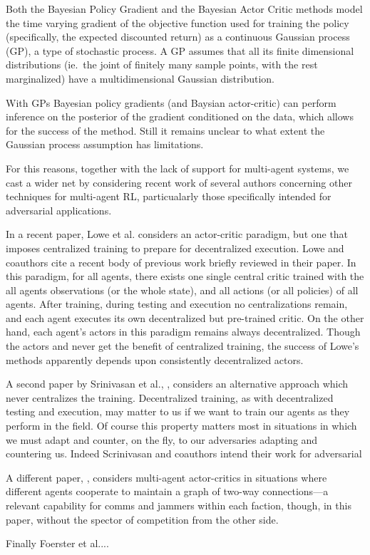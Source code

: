 \documentclass{article}
\begin{document}
Both the Bayesian Policy Gradient and the Bayesian Actor Critic
methods model the time varying gradient of the objective function used
for training the policy (specifically, the expected discounted return)
as a continuous Gaussian process (GP), a type of stochastic process.
A GP assumes that all its finite dimensional distributions (ie.\ the
joint of finitely many sample points, with the rest marginalized) have
a multidimensional Gaussian distribution.

With GPs Bayesian policy gradients (and Baysian actor-critic) can
perform inference on the posterior of the gradient conditioned on the
data, which allows for the success of the method.  Still it remains
unclear to what extent the Gaussian process assumption has
limitations.

For this reasons, together with the lack of support for multi-agent
systems, we cast a wider net by considering recent work of several
authors concerning other techniques for multi-agent RL, particualarly
those specifically intended for adversarial applications.

In a recent paper, Lowe et al. \cite{lowe2017multi} considers an
actor-critic paradigm, but one that imposes centralized training to
prepare for decentralized execution.  Lowe and coauthors cite a recent
body of previous work briefly reviewed in their paper.  In this
paradigm, for all agents, there exists one single central critic
trained with the all agents observations (or the whole state), and all
actions (or all policies) of all agents.  After training, during
testing and execution no centralizations remain, and each agent
executes its own decentralized but pre-trained critic.  On the other
hand, each agent's actors in this paradigm remains always
decentralized.  Though the actors and never get the benefit of
centralized training, the success of Lowe's methods apparently depends
upon consistently decentralized actors.

A second paper by Srinivasan et al., \cite{srinivasan2018actor},
considers an alternative approach which never centralizes the
training.  Decentralized training, as with decentralized testing and
execution, may matter to us if we want to train our agents as they
perform in the field.  Of course this property matters most in
situations in which we must adapt and counter, on the fly, to our
adversaries adapting and countering us.  Indeed Scrinivasan and
coauthors intend their work for adversarial

A different paper, \cite{su2020counterfactual}, considers multi-agent
actor-critics in situations where different agents cooperate to
maintain a graph of two-way connections---a relevant capability for
comms and jammers within each faction, though, in this paper, without
the spector of competition from the other side.

Finally Foerster et al....


% 

\end{document}
